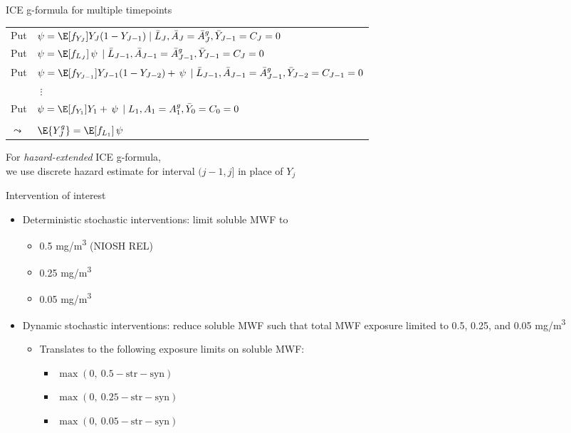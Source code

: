 \documentclass[
  11pt,
  ignorenonframetext,
]{beamer}
\providecommand{\tightlist}{%
  \setlength{\itemsep}{0pt}\setlength{\parskip}{0pt}}
\begin{document}
\begin{frame}{ICE g-formula for multiple timepoints}
\protect\hypertarget{ice-g-formula-for-multiple-timepoints}{}
\footnotesize\renewcommand{\arraystretch}{1.2}
\begin{tabular}{ll}
Put & $\psi =  \E[f_{Y_J}]{Y_J(1 - Y_{J - 1}) \mid \bar L_{J}, \bar A_{J} = \bar A^g_{J}, \bar Y_{J - 1} = C_J = 0}$ \\
Put & $\psi =  \E[f_{L_{J}}]{\,\psi\, \mid \bar L_{J - 1}, \bar A_{J - 1} = \bar A^g_{J - 1}, \bar Y_{J - 1} = C_{J} = 0}$ \\
Put & $\psi =  \E[f_{Y_{J - 1}}]{Y_{J - 1} (1 - Y_{J - 2}) + \,\psi\, \mid \bar L_{J - 1}, \bar A_{J - 1} = \bar A^g_{J - 1}, \bar Y_{J - 2} = C_{J - 1} = 0}$ \\
& $\hspace{4pt} \vdots$ \\
Put & $\psi =  \E[f_{Y_1}]{Y_1 + \,\psi\, \mid L_1, A_1 = A^g_1, \bar Y_{0} = C_0 = 0}$ \\
\\
$\leadsto$ &  $\E{Y^g_J} =  \E[f_{L_{1}}]{\,\psi\,}$
\end{tabular}

For \emph{hazard-extended} ICE g-formula,\\
we use discrete hazard estimate for interval \((j - 1, j]\) in place of
\(Y_j\)
\end{frame}

\begin{frame}{Intervention of interest}
\protect\hypertarget{intervention-of-interest}{}
\begin{itemize}
\tightlist
\item
  Deterministic stochastic interventions: limit soluble MWF to\\

  \begin{itemize}
  \tightlist
  \item
    0.5 mg/m\textsuperscript{3} (NIOSH REL)
  \item
    0.25 mg/m\textsuperscript{3}
  \item
    0.05 mg/m\textsuperscript{3}
  \end{itemize}
\item
  Dynamic stochastic interventions: reduce soluble MWF such that total
  MWF exposure limited to 0.5, 0.25, and 0.05 mg/m\textsuperscript{3}

  \begin{itemize}
  \tightlist
  \item
    Translates to the following exposure limits on soluble MWF:

    \begin{itemize}
    \tightlist
    \item
      \(\max\left(0,\ 0.5 - \text{str} - \text{syn}\right)\)
    \item
      \(\max\left(0,\ 0.25 - \text{str} - \text{syn}\right)\)
    \item
      \(\max\left(0,\ 0.05 - \text{str} - \text{syn}\right)\)
    \end{itemize}
  \end{itemize}
\end{itemize}
\end{frame}
\end{document}
